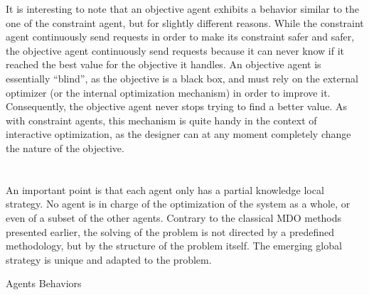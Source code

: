 It is interesting to note that an objective agent exhibits a behavior similar to the one of the constraint agent, but for slightly different reasons. While the constraint agent continuously send requests in order to make its constraint safer and safer, the objective agent continuously send requests because it can never know if it reached the best value for the objective it handles. An objective agent is essentially \enquote{blind}, as the objective is a black box, and must rely on the external optimizer (or the internal optimization mechanism) in order to improve it. Consequently, the objective agent never stops trying to find a better value. As with constraint agents, this mechanism is quite handy in the context of interactive optimization, as the designer can at any moment completely change the nature of the objective.
\\\\\\
An important point is that each agent only has a partial knowledge local strategy. No agent is in charge of the optimization of the system as a whole, or even of a subset of the other agents. Contrary to the classical MDO methods presented earlier, the solving of the problem is not directed by a predefined methodology, but by the structure of the problem itself. The emerging global strategy is unique and adapted to the problem.

\begin{algorithm}
\caption{Agents Behaviors}\label{agent_algo}






\end{algorithm}

